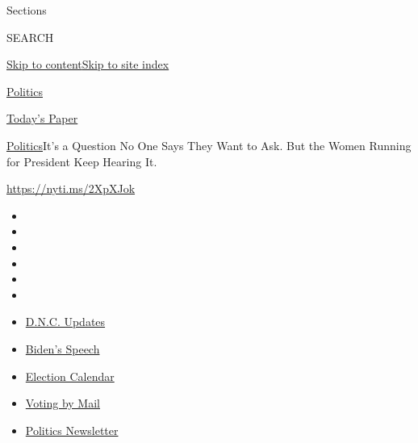 Sections

SEARCH

\protect\hyperlink{site-content}{Skip to
content}\protect\hyperlink{site-index}{Skip to site index}

\href{https://www.nytimes3xbfgragh.onion/section/politics}{Politics}

\href{https://myaccount.nytimes3xbfgragh.onion/auth/login?response_type=cookie\&client_id=vi}{}

\href{https://www.nytimes3xbfgragh.onion/section/todayspaper}{Today's
Paper}

\href{/section/politics}{Politics}\textbar{}It's a Question No One Says
They Want to Ask. But the Women Running for President Keep Hearing It.

\url{https://nyti.ms/2XpXJok}

\begin{itemize}
\item
\item
\item
\item
\item
\item
\end{itemize}

\begin{itemize}
\item
  \href{https://www.nytimes3xbfgragh.onion/live/2020/08/20/us/dnc-convention-election?action=click\&pgtype=Article\&state=default\&region=TOP_BANNER\&context=storylines_menu}{D.N.C.
  Updates}
\item
  \href{https://www.nytimes3xbfgragh.onion/2020/08/20/us/politics/biden-presidential-nomination-dnc.html?action=click\&pgtype=Article\&state=default\&region=TOP_BANNER\&context=storylines_menu}{Biden's
  Speech}
\item
  \href{https://www.nytimes3xbfgragh.onion/interactive/2019/us/elections/2020-presidential-election-calendar.html?action=click\&pgtype=Article\&state=default\&region=TOP_BANNER\&context=storylines_menu}{Election
  Calendar}
\item
  \href{https://www.nytimes3xbfgragh.onion/interactive/2020/08/11/us/politics/vote-by-mail-us-states.html?action=click\&pgtype=Article\&state=default\&region=TOP_BANNER\&context=storylines_menu}{Voting
  by Mail}
\item
  \href{https://www.nytimes3xbfgragh.onion/newsletters/politics?action=click\&pgtype=Article\&state=default\&region=TOP_BANNER\&context=storylines_menu}{Politics
  Newsletter}
\end{itemize}

